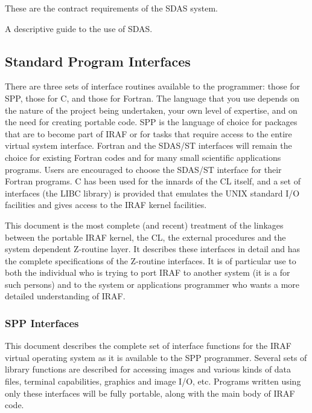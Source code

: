 \noindent
{}

These are the contract requirements of the SDAS system.

\noindent
{}

A descriptive guide to the use of SDAS.

\subsection{Standard Program Interfaces}

There are three sets of interface routines available to the programmer:
those for SPP, those for C, and those for Fortran. The language that
you use depends on the nature of the project being undertaken, your 
own level of expertise, and on the
need for creating portable code.  SPP is the language of choice for packages
that are to become part of IRAF or for tasks that require access to the
entire virtual system interface.  Fortran and the SDAS/ST
interfaces will remain the choice for existing Fortran codes and for many
small scientific applications programs.  Users are encouraged to choose 
the SDAS/ST interface for their Fortran programs.  C has been used
for the innards of the CL itself, and a set of interfaces (the LIBC library)
is provided that emulates the UNIX standard I/O facilities and 
gives access to the IRAF kernel facilities.

\noindent
{}

This document is the most complete (and recent) treatment of the
linkages between the portable IRAF kernel, the CL, the external procedures
and the system dependent Z-routine layer.  It describes these interfaces
in detail and has the complete specifications of the
Z-routine interfaces. It is of particular use to both the individual who is
trying to port IRAF to another system (it is a  for such
persons) and to the system or applications
programmer who wants a more detailed understanding of IRAF.

\subsubsection{SPP Interfaces}

\noindent
{}

This document describes the complete set of interface functions
for the IRAF virtual 
operating system as it is available to the SPP programmer.  Several
sets of library functions are described for accessing images and various
kinds of data files, terminal capabilities, graphics and image I/O, etc.
Programs written using only these interfaces
will be fully portable, along with the main body of IRAF code.

